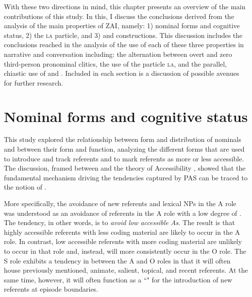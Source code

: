 \newpage
With these two directions in mind, this chapter presents an overview of the main contributions of this study. In this, I discuss the conclusions derived from the analysis of the main  properties of ZAI, namely: 1) nominal forms and cognitive status, 2) the \textsc{la} particle, and 3)  and  constructions. This discussion includes the conclusions reached in the analysis of the use of each of these three properties in narrative and conversation including: the alternation between overt and zero third-person pronominal clitics, the use of the particle \textsc{la}, and the parallel, chiastic use of  and . Included in each section is a discussion of possible avenues for further research.




\section{Nominal forms and cognitive status}

This study explored the relationship between form and distribution of nominals and between their form and function, analyzing the different forms that are used to introduce and track referents and to mark referents as more or less accessible. The discussion, framed between  \citep{dubois2003} and the theory of Accessibility \citep{ariel2001}, showed that the fundamental mechanism driving the tendencies captured by PAS can be traced to the notion of . 

More specifically, the avoidance of new referents and lexical NPs in the A role was understood as an avoidance of referents in the A role with a low degree of . The tendency, in other words, is to \textit{avoid low accessible As.} The result is that highly accessible referents with less coding material are likely to occur in the A role. In contrast, low accessible referents with more coding material are unlikely to occur in that role and, instead, will more consistently occur in the O role. The S role exhibits a tendency in between the A and O roles in that it will often house previously mentioned, animate, salient, topical, and recent referents. At the same time, however, it will often function as a ``" for the introduction of new referents at episode boundaries.

